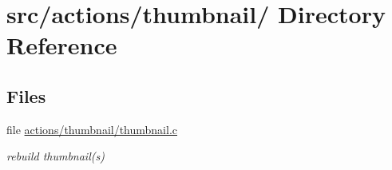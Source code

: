 \hypertarget{dir_000044}{
\section{src/actions/thumbnail/ Directory Reference}
\label{dir_000044}
}
\subsection*{Files}
\begin{CompactItemize}
\item 
file \hyperlink{actions_2thumbnail_2thumbnail_8c}{actions/thumbnail/thumbnail.c}
\begin{CompactList}\small\item\em rebuild thumbnail(s) \item\end{CompactList}

\end{CompactItemize}
